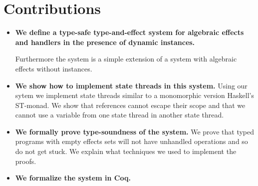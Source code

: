 \documentclass[12pt]{article}
\begin{document}
\section{Contributions}
\begin{itemize}

\item \textbf{We define a type-safe type-and-effect system for algebraic effects and handlers in the presence of dynamic instances.}

Furthermore the system is a simple extension of a system with algebraic effects without instances.

\item \textbf{We show how to implement state threads in this system.}
Using our sytem we implement state threads similar to a monomorphic version Haskell's ST-monad.
We show that references cannot escape their scope and that we cannot use a variable from one state thread in another state thread.

\item \textbf{We formally prove type-soundness of the system.}
We prove that typed programs with empty effects sets will not have unhandled operations and so do not get stuck.
We explain what techniques we used to implement the proofs.

\item \textbf{We formalize the system in Coq.}

\end{itemize}
\end{document}
